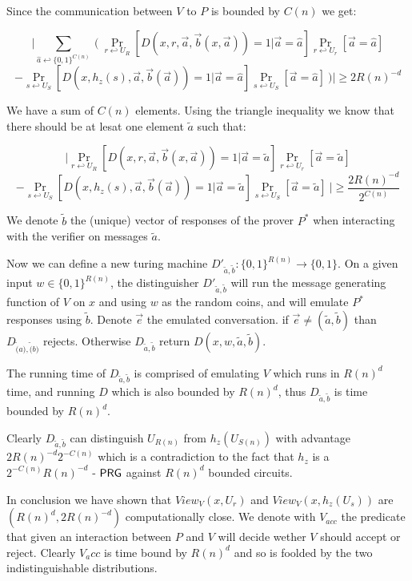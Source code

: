 \documentclass[11]{article}
\newenvironment{proof}[1][Proof]{\begin{trivlist}
\item[\hskip \labelsep {\bfseries #1}]}{\end{trivlist}}
\begin{document}
\begin{proof}
Since the communication between $V$ to $P$ is bounded by $C(n)$ we get:

$$ \bigg| \sum_{\hat{a} \hookleftarrow \{0,1\}^{C(n)}}\
\bigg(\
\Pr_{r \hookleftarrow U_R} [D(x, r,\vec{a}, \vec{b}(x,\vec{a})) = 1 | \vec{a}=\hat{a}]\Pr_{r \hookleftarrow U_r}[\vec{a}=\hat{a}]$$
$$- \Pr_{s \hookleftarrow U_S} [D(x, h_z(s),\vec{a}, \vec{b}(\vec{a})) = 1 | \vec{a}=\hat{a}]\Pr_{s \hookleftarrow U_S}[\vec{a}=\hat{a}]\
\bigg) \bigg| \geq 2R(n)^{-d}$$

We have a sum of $C(n)$ elements. Using the triangle inequality we know that there should be at lesat one element $\tilde{a}$ such that:

$$ \bigg| \Pr_{r \hookleftarrow U_R} [D(x, r,\vec{a}, \vec{b}(x,\vec{a})) = 1 | \vec{a}=\tilde{a}]\Pr_{r \hookleftarrow U_r}[\vec{a}=\tilde{a}]$$
$$- \Pr_{s \hookleftarrow U_S} [D(x, h_z(s),\vec{a}, \vec{b}(\vec{a})) = 1 | \vec{a}=\tilde{a}]\Pr_{s \hookleftarrow U_S}[\vec{a}=\tilde{a}]\
\bigg| \geq \frac{2R(n)^{-d}}{2^{C(n)}}$$

We denote $\tilde{b}$ the (unique) vector of responses of the prover $P^*$ when interacting with the verifier on messages $\tilde{a}$.

Now we can define a new turing machine $D'_{\tilde{a}, \tilde{b}}: \{0,1\}^{R(n)} \to \{0,1\}$. On a given input $w \in \{0,1\}^{R(n)}$, the distinguisher $D'_{\tilde{a}, \tilde{b}}$ will run the message generating function of $V$ on $x$ and using $w$ as the random coins, and will emulate $P^*$ responses using $\tilde{b}$. Denote $\vec{e}$ the emulated conversation. if $\vec{e} \neq (\tilde{a}, \tilde{b})$ than $D_{\tilde(a), \tilde(b)}$ rejects. Otherwise $D_{\tilde{a}, \tilde{b}}$ return $D(x, w, \tilde{a}, \tilde{b})$.

The running time of $D_{\tilde{a}, \tilde{b}}$ is comprised of emulating $V$ which runs in $R(n)^d$ time, and running $D$ which is also bounded by $R(n)^d$, thus $D_{\tilde{a}, \tilde{b}}$ is time bounded by $R(n)^d$.

Clearly $D_{\tilde{a}, \tilde{b}}$ can distinguish $U_{R(n)}$ from $h_z(U_{S(n)})$ with advantage $2R(n)^{-d} 2^{-C(n)}$ which is a contradiction to the fact that $h_z$ is a $2^{-C(n)} R(n)^{-d}$ - $\mathsf{PRG}$ against $R(n)^d$ bounded circuits.

In conclusion we have shown that $View_V(x,U_r)$ and $View_V(x, h_z(U_s))$ are $(R(n)^d, 2R(n)^{-d})$ computationally close. We denote with $V_{acc}$ the predicate that given an interaction between $P$ and $V$ will decide wether $V$ should accept or reject. Clearly $V_acc$ is time bound by $R(n)^d$ and so is foolded by the two indistinguishable distributions.


\end{proof}
\end{document}

